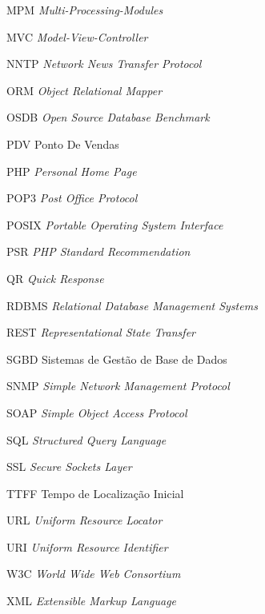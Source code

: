 \begin{siglas}
    \item[MPM] \textit{Multi-Processing-Modules}
    \item[MVC] \textit{Model-View-Controller}
    \item[NNTP] \textit{Network News Transfer Protocol}
    \item[ORM] \textit{Object Relational Mapper}
    \item[OSDB] \textit{Open Source Database Benchmark}
    \item[PDV] Ponto De Vendas
    \item[PHP] \textit{Personal Home Page}
    \item[POP3] \textit{Post Office Protocol}
    \item[POSIX] \textit{Portable Operating System Interface}
    \item[PSR] \textit{PHP Standard Recommendation}
    \item[QR] \textit{Quick Response}
    \item[RDBMS] \textit{Relational Database Management Systems}
    \item[REST] \textit{Representational State Transfer}
    \item[SGBD] Sistemas de Gestão de Base de Dados
    \item[SNMP] \textit{Simple Network Management Protocol}
    \item[SOAP] \textit{Simple Object Access Protocol}
    \item[SQL] \textit{Structured Query Language}
    \item[SSL] \textit{Secure Sockets Layer}
    \item[TTFF] Tempo de Localização Inicial
    \item[URL] \textit{Uniform Resource Locator}
    \item[URI] \textit{Uniform Resource Identifier}
    \item[W3C] \textit{World Wide Web Consortium}
    \item[XML] \textit{Extensible Markup Language}
\end{siglas}

